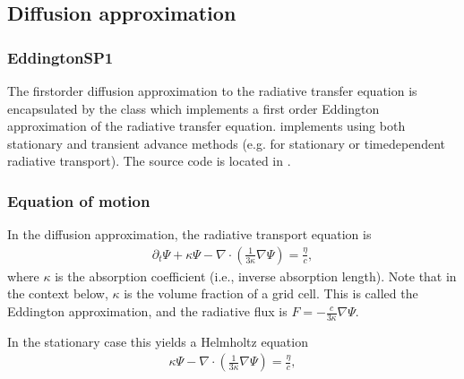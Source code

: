 \documentclass[letterpaper,10pt,english]{sphinxmanual}
\begin{document}
\subsection{Diffusion approximation}
\label{\detokenize{Solvers/RTE:diffusion-approximation}}\label{\detokenize{Solvers/RTE:chap-diffusionrte}}

\subsubsection{EddingtonSP1}
\label{\detokenize{Solvers/RTE:eddingtonsp1}}
The first\sphinxhyphen{}order diffusion approximation to the radiative transfer equation is encapsulated by the  class which implements a first order Eddington approximation of the radiative transfer equation.
 implements  using both stationary and transient advance methods (e.g. for stationary or time\sphinxhyphen{}dependent radiative transport).
The source code is located in .


\subsubsection{Equation of motion}
\label{\detokenize{Solvers/RTE:equation-of-motion}}
In the diffusion approximation, the radiative transport equation is
\begin{equation}\label{equation:Solvers/RTE:TransientDiffusionRTE}
\begin{split}\partial_t\Psi + \kappa\Psi - \nabla\cdot\left(\frac{1}{3\kappa}\nabla\Psi\right) = \frac{\eta}{c},\end{split}
\end{equation}
where \(\kappa\) is the absorption coefficient (i.e., inverse absorption length).
Note that in the context below, \(\kappa\) is  the volume fraction of a grid cell.
This is called the Eddington approximation, and the radiative flux is \(F = -\frac{c}{3\kappa}\nabla \Psi\).

In the stationary case this yields a Helmholtz equation
\begin{equation}\label{equation:Solvers/RTE:StationaryDiffusionRTE}
\begin{split}\kappa\Psi - \nabla\cdot\left(\frac{1}{3\kappa}\nabla\Psi\right) = \frac{\eta}{c},\end{split}
\end{equation}
\end{document}
